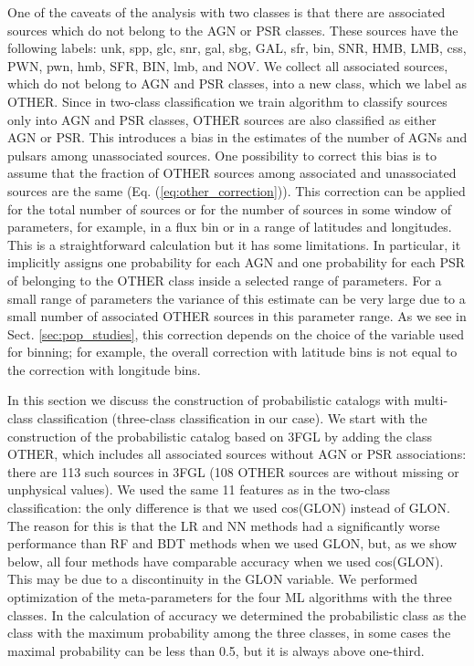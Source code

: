 \documentclass[referee]{aa} %
\begin{document}
One of the caveats of the analysis with two classes is that there are associated sources which do not belong to the AGN or PSR classes. 
These sources have the following labels: unk, spp, glc, snr, gal, sbg, GAL, sfr, bin, SNR, HMB, LMB, css, PWN, pwn, hmb, SFR, BIN, lmb, and NOV.
We collect all associated sources, which do not belong to AGN and PSR classes, into a new class, which we label as OTHER.
Since in two-class classification we train algorithm to classify sources only into AGN and PSR classes, OTHER sources are also classified as either AGN or PSR.
This introduces a bias in the estimates of the number of AGNs and pulsars among unassociated sources.
One possibility to correct this bias is to assume that the fraction of OTHER sources among associated and unassociated sources are the same (Eq. (\ref{eq:other_correction})).
This correction can be applied for the total number of sources or for the number of sources in some window of parameters,
for example, in a flux bin or in a range of latitudes and longitudes.
This is a straightforward calculation but it has some limitations. 
In particular, it implicitly assigns one probability for each AGN and one probability for each PSR of belonging to the OTHER class inside a selected range of parameters.
For a small range of parameters the variance of this estimate can be very large due to a small number of associated OTHER sources in this parameter range.
As we see in Sect. \ref{sec:pop_studies}, this correction depends on the choice of the variable used for binning; for example,
the overall correction with latitude bins is not equal to the correction with longitude bins.

In this section we discuss the construction of probabilistic catalogs with multi-class classification (three-class classification in our case).
We start with the construction of the probabilistic catalog based on 3FGL by adding the class OTHER, which includes all associated sources without AGN or PSR associations: there are 113 such sources in 3FGL (108 OTHER sources are without missing or unphysical values).
We used the same 11 features as in the two-class classification: the only difference is that we used cos(GLON) instead of GLON.
The reason for this is that the LR and NN methods had a significantly worse performance than RF and BDT methods when we used GLON,
but, as we show below, all four methods have comparable accuracy when we used cos(GLON).
This may be due to a discontinuity in the GLON variable. 
We performed optimization of the meta-parameters for the four ML algorithms with the three classes.
In the calculation of accuracy we determined the probabilistic class as the class with the maximum probability among the three classes,
in some cases the maximal probability can be less than 0.5, but it is always above one-third.
\end{document}
